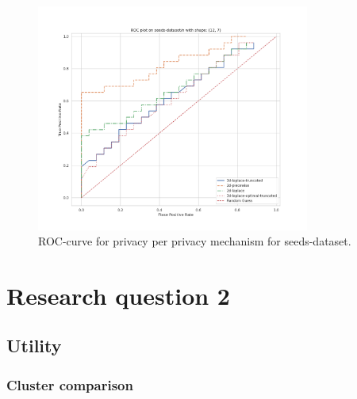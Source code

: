 \begin{figure}[H]
    \includegraphics[width=0.8\textwidth]{Results/RQ1/seeds-dataset/roc_plot.png}
    \caption{ROC-curve for privacy per privacy mechanism for seeds-dataset.}
    \label{fig:privacy_seeds-dataset_comparison_2d_roc_plot}
\end{figure}

\newpage
\section{Research question 2}
\subsection{Utility}
\subsubsection*{Cluster comparison}

